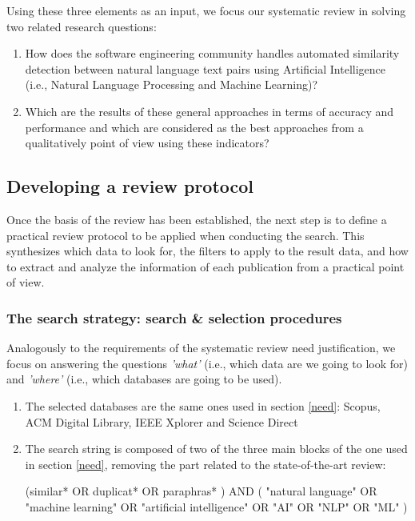Using these three elements as an input, we focus our systematic review in solving two related research questions:

\begin{enumerate}
\item How does the software engineering community handles automated similarity detection between natural language text pairs using Artificial Intelligence (i.e., Natural Language Processing and Machine Learning)?
\item Which are the results of these general approaches in terms of accuracy and performance and which are considered as the best approaches from a qualitatively point of view using these indicators?
\end{enumerate}

\subsection{Developing a review protocol}

Once the basis of the review has been established, the next step is to define a practical review protocol to be applied when conducting the search. This synthesizes which data to look for, the filters to apply to the result data, and how to extract and analyze the information of each publication from a practical point of view.

\subsubsection{The search strategy: search \& selection procedures}

Analogously to the requirements of the systematic review need justification, we focus on answering the questions \textit{'what'} (i.e., which data are we going to look for) and \textit{'where'} (i.e., which databases are going to be used).

\begin{enumerate}
\item The selected databases are the same ones used in section \ref{need}: Scopus, ACM Digital Library, IEEE Xplorer and Science Direct
\item The search string is composed of two of the three main blocks of the one used in section \ref{need}, removing the part related to the state-of-the-art review:
\begin{center}
(similar*  OR  duplicat*  OR  paraphras* )  AND  ( "natural language"  OR  "machine learning"  OR  "artificial intelligence"  OR  "AI" OR  "NLP"  OR  "ML" )
\end{center}
\end{enumerate}

